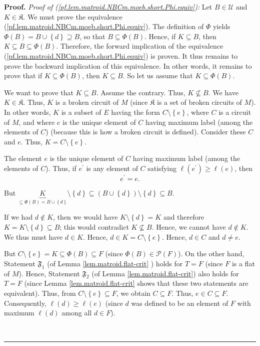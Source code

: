 \documentclass[numbers=enddot,12pt,final,onecolumn,notitlepage]{scrartcl}%
\theoremstyle{definition}
\newenvironment{proof}[1][Proof]{\noindent\textbf{#1.} }{\ \rule{0.5em}{0.5em}}
\begin{document}
\begin{proof}
\textit{Proof of (\ref{pf.lem.matroid.NBCm.moeb.short.Phi.equiv}):} Let
$B\in\mathcal{U}$ and $K\in\mathfrak{K}$. We must prove the equivalence
(\ref{pf.lem.matroid.NBCm.moeb.short.Phi.equiv}). The definition of $\Phi$
yields $\Phi\left(  B\right)  =B\cup\left\{  d\right\}  \supseteq B$, so that
$B\subseteq\Phi\left(  B\right)  $. Hence, if $K\subseteq B$, then $K\subseteq
B\subseteq\Phi\left(  B\right)  $. Therefore, the forward implication of the
equivalence (\ref{pf.lem.matroid.NBCm.moeb.short.Phi.equiv}) is proven. It
thus remains to prove the backward implication of this equivalence. In other
words, it remains to prove that if $K\subseteq\Phi\left(  B\right)  $, then
$K\subseteq B$. So let us assume that $K\subseteq\Phi\left(  B\right)  $.

We want to prove that $K\subseteq B$. Assume the contrary. Thus,
$K\not \subseteq B$. We have $K\in\mathfrak{K}$. Thus, $K$ is a broken circuit
of $M$ (since $\mathfrak{K}$ is a set of broken circuits of $M$). In other
words, $K$ is a subset of $E$ having the form $C\setminus\left\{  e\right\}
$, where $C$ is a circuit of $M$, and where $e$ is the unique element of $C$
having maximum label (among the elements of $C$) (because this is how a broken
circuit is defined). Consider these $C$ and $e$. Thus, $K=C\setminus\left\{
e\right\}  $.

The element $e$ is the unique element of $C$ having maximum label (among the
elements of $C$). Thus, if $e^{\prime}$ is any element of $C$ satisfying
$\ell\left(  e^{\prime}\right)  \geq\ell\left(  e\right)  $, then%
\begin{equation}
e^{\prime}=e. \label{pf.lem.matroid.NBCm.moeb.short.Phi.equiv.pf.e'}%
\end{equation}


But $\underbrace{K}_{\subseteq\Phi\left(  B\right)  =B\cup\left\{  d\right\}
}\setminus\left\{  d\right\}  \subseteq\left(  B\cup\left\{  d\right\}
\right)  \setminus\left\{  d\right\}  \subseteq B$.

If we had $d\notin K$, then we would have $K\setminus\left\{  d\right\}  =K$
and therefore $K=K\setminus\left\{  d\right\}  \subseteq B$; this would
contradict $K\not \subseteq B$. Hence, we cannot have $d\notin K$. We thus
must have $d\in K$. Hence, $d\in K=C\setminus\left\{  e\right\}  $. Hence,
$d\in C$ and $d\neq e$.

But $C\setminus\left\{  e\right\}  =K\subseteq\Phi\left(  B\right)  \subseteq
F$ (since $\Phi\left(  B\right)  \in\mathcal{P}\left(  F\right)  $). On the
other hand, Statement $\mathfrak{F}_{1}$ (of Lemma \ref{lem.matroid.flat-crit}%
) holds for $T=F$ (since $F$ is a flat of $M$). Hence, Statement
$\mathfrak{F}_{2}$ (of Lemma \ref{lem.matroid.flat-crit}) also holds for $T=F$
(since Lemma \ref{lem.matroid.flat-crit} shows that these two statements are
equivalent). Thus, from $C\setminus\left\{  e\right\}  \subseteq F$, we obtain
$C\subseteq F$. Thus, $e\in C\subseteq F$. Consequently, $\ell\left(
d\right)  \geq\ell\left(  e\right)  $ (since $d$ was defined to be an element
of $F$ with maximum $\ell\left(  d\right)  $ among all $d\in F$).


\end{proof}
\end{document}
